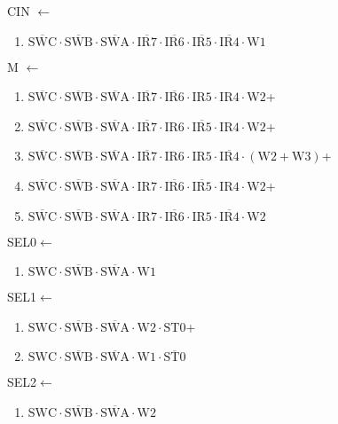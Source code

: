 \documentclass[UTF8]{ctexart}
\begin{document}
\noindent CIN $\leftarrow$
\begin{enumerate}[\indent\indent]
	\item $\overline{\text{SWC}} \cdot\overline{\text{SWB}}\cdot \overline{\text{SWA}} \cdot \overline{\text{IR7}} \cdot \overline{\text{IR6}} \cdot \overline{\text{IR5}} \cdot \overline{\text{IR4}} \cdot \text{W1}$
\end{enumerate}
\noindent M $\leftarrow$
\begin{enumerate}[\indent\indent]
	\item $\overline{\text{SWC}} \cdot\overline{\text{SWB}}\cdot \overline{\text{SWA}} \cdot \overline{\text{IR7}} \cdot \overline{\text{IR6}} \cdot \text{IR5} \cdot \text{IR4} \cdot \text{W2}$+
	\item $\overline{\text{SWC}} \cdot\overline{\text{SWB}}\cdot \overline{\text{SWA}} \cdot \overline{\text{IR7}} \cdot \text{IR6} \cdot \overline{\text{IR5}} \cdot \text{IR4} \cdot \text{W2}$+
	\item $\overline{\text{SWC}} \cdot\overline{\text{SWB}}\cdot \overline{\text{SWA}} \cdot \overline{\text{IR7}} \cdot \text{IR6} \cdot \text{IR5} \cdot \overline{\text{IR4}} \cdot (\text{W2} + \text{W3})$+
	\item $\overline{\text{SWC}} \cdot\overline{\text{SWB}}\cdot \overline{\text{SWA}} \cdot \text{IR7} \cdot \overline{\text{IR6}} \cdot \overline{\text{IR5}} \cdot \text{IR4} \cdot \text{W2}$+
	\item $\overline{\text{SWC}} \cdot\overline{\text{SWB}}\cdot \overline{\text{SWA}} \cdot \text{IR7} \cdot \overline{\text{IR6}} \cdot \text{IR5} \cdot \overline{\text{IR4}} \cdot \text{W2}$
\end{enumerate}
\noindent SEL0$\leftarrow$
\begin{enumerate}[\indent\indent]
	\item$\text{SWC}\cdot\overline{\text{SWB}}\cdot\overline{\text{SWA}}\cdot\text{W1}$
\end{enumerate}
\noindent SEL1$\leftarrow$
\begin{enumerate}[\indent\indent]
	\item$\text{SWC}\cdot\overline{\text{SWB}}\cdot\overline{\text{SWA}}\cdot\text{W2}\cdot\text{ST0}$+
	\item$\text{SWC}\cdot\overline{\text{SWB}}\cdot\overline{\text{SWA}}\cdot\text{W1}\cdot\overline{\text{ST0}}$
\end{enumerate}
\noindent SEL2$\leftarrow$
\begin{enumerate}[\indent\indent]
	\item$\text{SWC}\cdot\overline{\text{SWB}}\cdot\overline{\text{SWA}}\cdot\text{W2}$
\end{enumerate}
\end{document}
